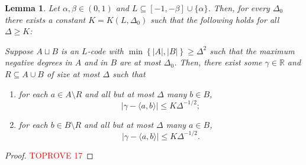 \documentclass[reqno, 11pt]{amsart}
\newtheorem{lemma}[theorem]{Lemma}
\theoremstyle{definition}
\theoremstyle{remark}
\newcommand{\set}[1]{\left\{ #1 \right\}}
\newcommand{\RR}{\mathbb{R}}
\begin{document}
\begin{lemma}\label{lem:two-positive-cliques}
Let $ \alpha, \beta \in (0,1)$ and $L \subseteq [-1,-\beta]\cup\{\alpha\}$. Then, for every $\Delta_0$ there exists a constant $K = K(L, \Delta_0) $ such that the following holds for all $\Delta \geq K$: 

Suppose $A \sqcup B$ is an $L$-code with $\min\set{|A|,|B|} \geq \Delta^2$ such that the maximum negative degrees in $A$ and in $B$ are at most $\Delta_0$. Then, there exist some $\gamma \in \RR$ and $R \subseteq A \cup B$  of size at most $\Delta$ such that
\begin{enumerate}
	\item for each $a \in A \setminus R$ and all but at most $\Delta$ many $b \in B$,
	\[
		|\gamma - \langle a,b\rangle| \leq K\Delta^{-1/2};
	\]
	\item for each $b \in B \setminus R$ and all but at most $\Delta$ many $a \in B$,
	\[
		|\gamma - \langle a,b\rangle| \leq K\Delta^{-1/2}.
	\]
\end{enumerate}
\end{lemma}	

\begin{proof}\textcolor{red}{TOPROVE 17}\end{proof}
\end{document}
